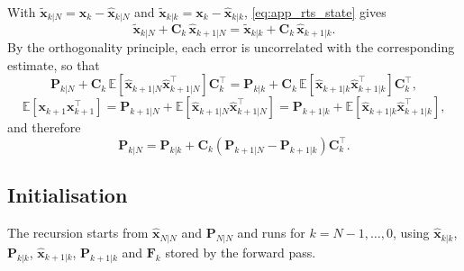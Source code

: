 With $\tilde{\mathbf{x}}_{k|N} = \mathbf{x}_k - \hat{\mathbf{x}}_{k|N}$ and
$\tilde{\mathbf{x}}_{k|k} = \mathbf{x}_k - \hat{\mathbf{x}}_{k|k}$,
\eqref{eq:app_rts_state} gives
\begin{equation}
    \tilde{\mathbf{x}}_{k|N} + \mathbf{C}_k\,\hat{\mathbf{x}}_{k+1|N}
    = \tilde{\mathbf{x}}_{k|k} + \mathbf{C}_k\,\hat{\mathbf{x}}_{k+1|k}.
\end{equation}
By the orthogonality principle, each error is uncorrelated with the corresponding estimate,
so that
\begin{equation}
    \mathbf{P}_{k|N} + \mathbf{C}_k\,\mathbb{E}\!\left[\hat{\mathbf{x}}_{k+1|N}\hat{\mathbf{x}}_{k+1|N}^\top\right]\mathbf{C}_k^\top
    = \mathbf{P}_{k|k} + \mathbf{C}_k\,\mathbb{E}\!\left[\hat{\mathbf{x}}_{k+1|k}\hat{\mathbf{x}}_{k+1|k}^\top\right]\mathbf{C}_k^\top,
\end{equation}
\begin{equation}
    \mathbb{E}\!\left[\mathbf{x}_{k+1}\mathbf{x}_{k+1}^\top\right]
    = \mathbf{P}_{k+1|N} + \mathbb{E}\!\left[\hat{\mathbf{x}}_{k+1|N}\hat{\mathbf{x}}_{k+1|N}^\top\right]
    = \mathbf{P}_{k+1|k} + \mathbb{E}\!\left[\hat{\mathbf{x}}_{k+1|k}\hat{\mathbf{x}}_{k+1|k}^\top\right],
\end{equation}
and therefore
\begin{equation}
    \mathbf{P}_{k|N} = \mathbf{P}_{k|k}
    + \mathbf{C}_k\left(\mathbf{P}_{k+1|N} - \mathbf{P}_{k+1|k}\right)\mathbf{C}_k^\top.
\end{equation}

\subsection*{Initialisation}

The recursion starts from $\hat{\mathbf{x}}_{N|N}$ and $\mathbf{P}_{N|N}$ and runs for
$k = N-1, \dots, 0$, using $\hat{\mathbf{x}}_{k|k}$, $\mathbf{P}_{k|k}$,
$\hat{\mathbf{x}}_{k+1|k}$, $\mathbf{P}_{k+1|k}$ and $\mathbf{F}_k$ stored by the forward pass.
